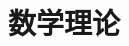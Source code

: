 \documentclass[UTF8,a4paper,12pt]{ctexbook}
\begin{document}
\chapter{数学理论}
	
































































































	
\end{document}
